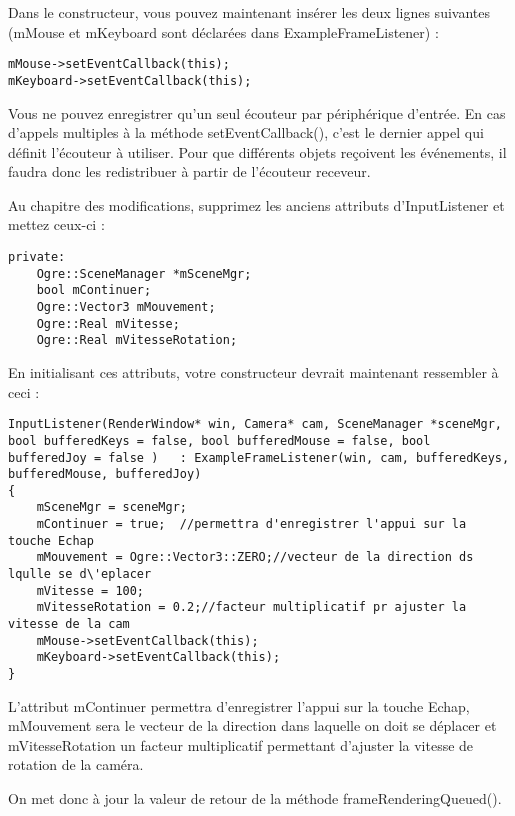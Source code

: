 \documentclass[10pt,a4paper]{report}
\begin{document}
Dans le constructeur, vous pouvez maintenant ins\'erer les deux lignes suivantes (mMouse et mKeyboard sont d\'eclar\'ees dans ExampleFrameListener) :

\begin{lstlisting}[caption={Enregistrement des listener}]
mMouse->setEventCallback(this);
mKeyboard->setEventCallback(this);
\end{lstlisting}

Vous ne pouvez enregistrer qu'un seul \'ecouteur par p\'eriph\'erique d'entr\'ee. En cas d'appels multiples \`a la m\'ethode setEventCallback(), c'est le dernier appel qui d\'efinit l'\'ecouteur \`a utiliser. Pour que diff\'erents objets re\c{c}oivent les \'ev\'enements, il faudra donc les redistribuer \`a partir de l'\'ecouteur receveur.

Au chapitre des modifications, supprimez les anciens attributs d'InputListener et mettez ceux-ci :

\begin{lstlisting}[caption={Attributs d'InputListener}]
private:
    Ogre::SceneManager *mSceneMgr;
    bool mContinuer;
    Ogre::Vector3 mMouvement;
    Ogre::Real mVitesse;
    Ogre::Real mVitesseRotation;
\end{lstlisting}

En initialisant ces attributs, votre constructeur devrait maintenant ressembler \`a ceci :

\begin{lstlisting}[caption={Constructeur d'InputListener}]
InputListener(RenderWindow* win, Camera* cam, SceneManager *sceneMgr, bool bufferedKeys = false, bool bufferedMouse = false, bool bufferedJoy = false )   : ExampleFrameListener(win, cam, bufferedKeys, bufferedMouse, bufferedJoy)
{
    mSceneMgr = sceneMgr;
    mContinuer = true;  //permettra d'enregistrer l'appui sur la touche Echap
    mMouvement = Ogre::Vector3::ZERO;//vecteur de la direction ds lqulle se d\'eplacer
    mVitesse = 100;
    mVitesseRotation = 0.2;//facteur multiplicatif pr ajuster la vitesse de la cam 
    mMouse->setEventCallback(this);
    mKeyboard->setEventCallback(this);
}
\end{lstlisting}

L'attribut mContinuer permettra d'enregistrer l'appui sur la touche Echap, mMouvement sera le vecteur de la direction dans laquelle on doit se d\'eplacer et mVitesseRotation un facteur multiplicatif permettant d'ajuster la vitesse de rotation de la cam\'era.

On met donc \`a jour la valeur de retour de la m\'ethode frameRenderingQueued().
\end{document}
